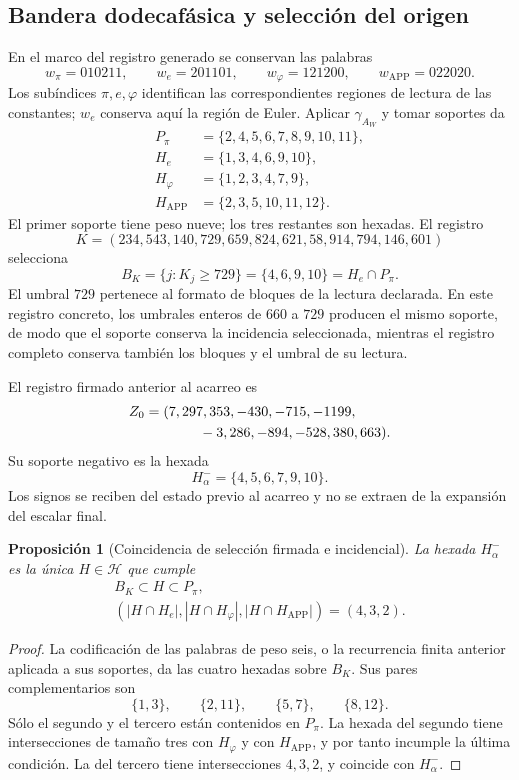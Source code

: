 \documentclass[a4paper,10pt]{article}
\newtheorem{proposition}[theorem]{Proposición}
\theoremstyle{definition}\newtheorem{definition}[theorem]{Definición}
\theoremstyle{remark}\newtheorem{remark}[theorem]{Observación}
\numberwithin{equation}{section}
\begin{document}
\subsection{Bandera dodecafásica y selección del origen}
\label{subsec:lf-flag}

En el marco del registro generado se conservan las palabras
\[
 w_\pi=010211,\qquad
 w_e=201101,\qquad
 w_\varphi=121200,\qquad
 w_{\mathrm{APP}}=022020.
\]
Los subíndices \(\pi,e,\varphi\) identifican las correspondientes
regiones de lectura de las constantes; \(w_e\) conserva aquí
la región de Euler. Aplicar \(\gamma_{A_W}\) y tomar soportes da
\[
\begin{aligned}
 P_\pi&=\{2,4,5,6,7,8,9,10,11\},\\
 H_e&=\{1,3,4,6,9,10\},\\
 H_\varphi&=\{1,2,3,4,7,9\},\\
 H_{\mathrm{APP}}&=\{2,3,5,10,11,12\}.
\end{aligned}
\]
El primer soporte tiene peso nueve; los tres restantes son
hexadas. El registro
\[
 K=(234,543,140,729,659,824,621,58,914,794,146,601)
\]
selecciona
\[
 B_K=\{j:K_j\geq729\}=\{4,6,9,10\}=H_e\cap P_\pi.
\]
El umbral \(729\) pertenece al formato de bloques de la
lectura declarada. En este registro concreto, los umbrales
enteros de \(660\) a \(729\) producen el mismo soporte, de
modo que el soporte conserva la incidencia seleccionada,
mientras el registro completo conserva también los bloques
y el umbral de su lectura.

El registro firmado anterior al acarreo es
\[
\begin{split}
 Z_0={}&(7,297,353,-430,-715,-1199,\\
       &\hspace{9mm}-3,286,-894,-528,380,663).
\end{split}
\]
Su soporte negativo es la hexada
\[
 H_\alpha^-=\{4,5,6,7,9,10\}.
\]
Los signos se reciben del estado previo al acarreo y no se
extraen de la expansión del escalar final.

\begin{proposition}[Coincidencia de selección firmada e incidencial]
\label{prop:lf-flag}
La hexada \(H_\alpha^-\) es la única \(H\in\mathcal H\) que cumple
\[
\begin{gathered}
 B_K\subset H\subset P_\pi,\\
 (|H\cap H_e|,|H\cap H_\varphi|,
                   |H\cap H_{\mathrm{APP}}|)=(4,3,2).
\end{gathered}
\]
\end{proposition}
\begin{proof}
La codificación de las palabras de peso seis, o la recurrencia
finita anterior aplicada a sus soportes, da las cuatro
hexadas sobre \(B_K\). Sus pares complementarios son
\[
 \{1,3\},\qquad\{2,11\},\qquad\{5,7\},\qquad\{8,12\}.
\]
Sólo el segundo y el tercero están contenidos en \(P_\pi\).
La hexada del segundo tiene intersecciones de tamaño tres
con \(H_\varphi\) y con \(H_{\mathrm{APP}}\), y por tanto
incumple la última condición. La del tercero tiene
intersecciones \(4,3,2\), y coincide con \(H_\alpha^-\).
\end{proof}
\end{document}
